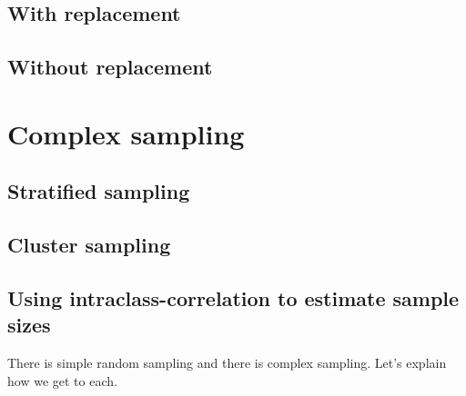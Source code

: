 \documentclass[
  letterpaper,
  DIV=11,
  numbers=noendperiod]{scrreprt}
\begin{document}
\section{With replacement}\label{with-replacement}

\section{Without replacement}\label{without-replacement}

\chapter{Complex sampling}\label{complex-sampling}

\section{Stratified sampling}\label{stratified-sampling}

\section{Cluster sampling}\label{cluster-sampling}

\section{Using intraclass-correlation to estimate sample
sizes}\label{using-intraclass-correlation-to-estimate-sample-sizes}

There is simple random sampling and there is complex sampling. Let's
explain how we get to each.
\end{document}
